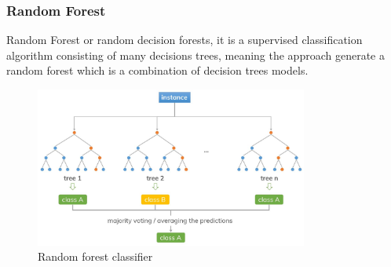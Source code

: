 \subsubsection{Random Forest}
Random Forest or random decision forests, it is a supervised classification algorithm consisting
of many decisions trees, meaning the approach generate a random forest which is a combination
of decision trees models.
\begin{figure}[!h]
    \centering
    \includegraphics[width=0.8\textwidth]{chapters/chapter02/fig02/rf1.jpg}
    \caption{Random forest classifier}
    \label{fig:my_label}
\end{figure}

